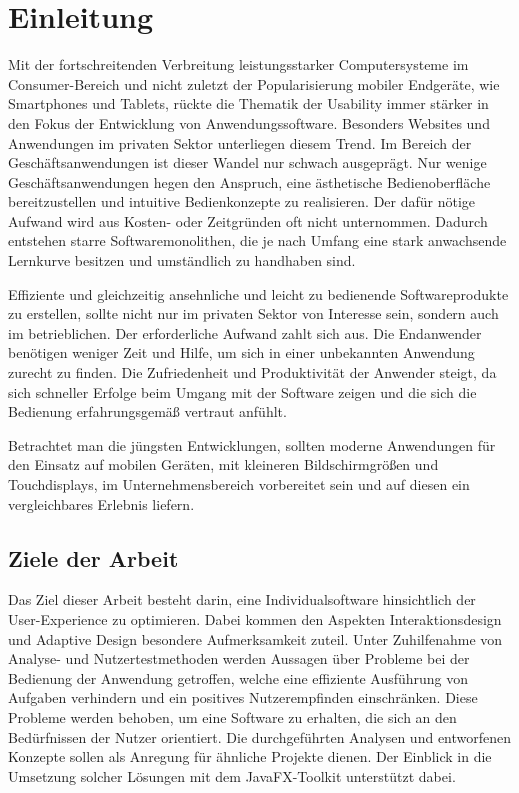 \chapter{Einleitung}
Mit der fortschreitenden Verbreitung leistungsstarker Computersysteme im Consumer-Bereich und nicht zuletzt der Popularisierung mobiler Endgeräte, wie Smartphones und Tablets, rückte die Thematik der Usability immer stärker in den Fokus der Entwicklung von Anwendungssoftware. Besonders Websites und Anwendungen im privaten Sektor unterliegen diesem Trend. Im Bereich der Geschäftsanwendungen ist dieser Wandel nur schwach ausgeprägt. Nur wenige Geschäftsanwendungen hegen den Anspruch, eine ästhetische Bedienoberfläche bereitzustellen und intuitive Bedienkonzepte zu realisieren. Der dafür nötige Aufwand wird aus Kosten- oder Zeitgründen oft nicht unternommen. Dadurch entstehen starre Softwaremonolithen, die je nach Umfang eine stark anwachsende Lernkurve besitzen und umständlich zu handhaben sind.\par
Effiziente und gleichzeitig ansehnliche und leicht zu bedienende Softwareprodukte zu erstellen, sollte nicht nur im privaten Sektor von Interesse sein, sondern auch im betrieblichen. Der erforderliche Aufwand zahlt sich aus. Die Endanwender benötigen weniger Zeit und Hilfe, um sich in einer unbekannten Anwendung zurecht zu finden. Die Zufriedenheit und Produktivität der Anwender steigt, da sich schneller Erfolge beim Umgang mit der Software zeigen und die sich die Bedienung erfahrungsgemäß vertraut anfühlt.\par
Betrachtet man die jüngsten Entwicklungen, sollten moderne Anwendungen für den Einsatz auf mobilen Geräten, mit kleineren Bildschirmgrößen und Touchdisplays, im Unternehmensbereich vorbereitet sein und auf diesen ein vergleichbares Erlebnis liefern.\par
\section{Ziele der Arbeit} \label{sec:einlZiel}
Das Ziel dieser Arbeit besteht darin, eine Individualsoftware hinsichtlich der User-Experience zu optimieren. Dabei kommen den Aspekten Interaktionsdesign und Adaptive Design besondere Aufmerksamkeit zuteil. Unter Zuhilfenahme von Analyse- und Nutzertestmethoden werden Aussagen über Probleme bei der Bedienung der Anwendung getroffen, welche eine effiziente Ausführung von Aufgaben verhindern und ein positives Nutzerempfinden einschränken. Diese Probleme werden behoben, um eine Software zu erhalten, die sich an den Bedürfnissen der Nutzer orientiert. Die durchgeführten Analysen und entworfenen Konzepte sollen als Anregung für ähnliche Projekte dienen. Der Einblick in die Umsetzung solcher Lösungen mit dem JavaFX-Toolkit unterstützt dabei.\par
